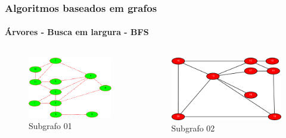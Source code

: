 \begin{frame}
	\frametitle{Algoritmos baseados em grafos}
	\framesubtitle{Árvores - Busca em largura - BFS}
	\begin{columns}
		\begin{column}{0.5\textwidth}
			\begin{figure}
				\centering
				\includegraphics[width=\linewidth]{images/buscaEmLargura12}
				\caption{Subgrafo 01}
				\label{fig:buscaemlargura13}
			\end{figure}
		\end{column}
		\begin{column}{0.5\textwidth}
			\begin{figure}
				\centering
				\includegraphics[width=\linewidth]{images/buscaEmLargura13}
				\caption{Subgrafo 02}
				\label{fig:buscaemlargura14}
			\end{figure}
		\end{column}
	\end{columns}
\end{frame}

